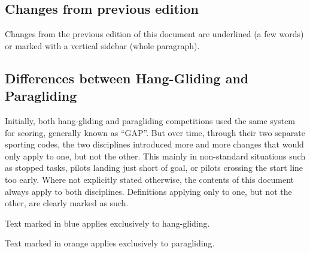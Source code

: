 \documentclass[gap.tex]{subfiles}
\begin{document}
\subsection{Changes from previous edition}
Changes from the previous edition of this document are underlined (a few words)
or marked with a vertical sidebar (whole paragraph).

\subsection{Differences between Hang-Gliding and Paragliding}
Initially, both hang-gliding and paragliding competitions used the same system
for scoring, generally known as “GAP”. But over time, through their two
separate sporting codes, the two disciplines introduced more and more changes
that would only apply to one, but not the other. This mainly in non-standard
situations such as stopped tasks, pilots landing just short of goal, or pilots
crossing the start line too early. Where not explicitly stated otherwise, the
contents of this document always apply to both disciplines. Definitions
applying only to one, but not the other, are clearly marked as such.

\begin{hg}
Text marked in blue applies exclusively to hang-gliding.
\end{hg}

\begin{pg}
Text marked in orange applies exclusively to paragliding.
\end{pg}
\end{document}
